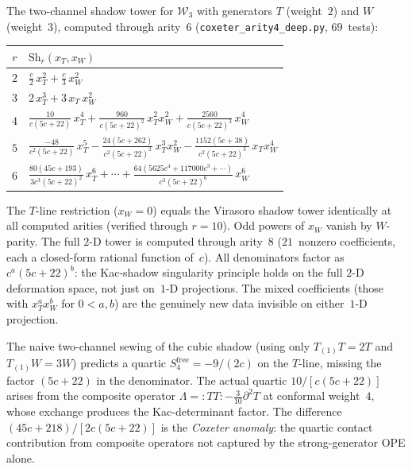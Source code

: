 \begin{example}
\label{ex:w3-shadow-coefficients}
The two-channel shadow tower for $\mathcal{W}_3$ with generators $T$ (weight~$2$) and $W$ (weight~$3$), computed through arity~$6$ (\texttt{coxeter\_arity4\_deep.py}, $69$~tests):
\begin{center}
\small
\renewcommand{\arraystretch}{1.3}
\begin{tabular}{cl}
\toprule
$r$ & $\mathrm{Sh}_r(x_T, x_W)$ \\
\midrule
$2$ & $\frac{c}{2}\,x_T^2 + \frac{c}{3}\,x_W^2$ \\[4pt]
$3$ & $2\,x_T^3 + 3\,x_T\,x_W^2$ \\[4pt]
$4$ & $\frac{10}{c(5c{+}22)}\,x_T^4 + \frac{960}{c(5c{+}22)^2}\,x_T^2 x_W^2 + \frac{2560}{c(5c{+}22)^3}\,x_W^4$ \\[4pt]
$5$ & $\frac{-48}{c^2(5c{+}22)}\,x_T^5
      - \frac{24(5c{+}262)}{c^2(5c{+}22)^2}\,x_T^3 x_W^2
      - \frac{1152(5c{+}38)}{c^2(5c{+}22)^3}\,x_T x_W^4$ \\[4pt]
$6$ & $\frac{80(45c{+}193)}{3c^3(5c{+}22)^2}\,x_T^6
      + \dotsb
      + \frac{64(5625c^4{+}117000c^3{+}\dotsb)}{c^3(5c{+}22)^6}\,x_W^6$ \\
\bottomrule
\end{tabular}
\end{center}
\noindent
The $T$-line restriction ($x_W = 0$) equals the Virasoro shadow tower identically at all computed arities (verified through $r = 10$).  Odd powers of $x_W$ vanish by $W$-parity.  The full $2$-D tower is computed through arity~$8$ ($21$~nonzero coefficients, each a closed-form rational function of~$c$).  All denominators factor as $c^a(5c{+}22)^b$: the Kac-shadow singularity principle holds on the full $2$-D deformation space, not just on~$1$-D projections.  The mixed coefficients (those with $x_T^a x_W^b$ for $0 < a, b$) are the genuinely new data invisible on either~$1$-D projection.
\end{example}

\begin{remark}
\label{rem:coxeter-anomaly}
The naive two-channel sewing of the cubic shadow (using only $T_{(1)}T = 2T$ and $T_{(1)}W = 3W$) predicts a quartic $S_4^{\mathrm{free}} = -9/(2c)$ on the $T$-line, missing the factor $(5c{+}22)$ in the denominator.  The actual quartic $10/[c(5c{+}22)]$ arises from the composite operator $\Lambda = {:}TT{:} - \tfrac{3}{10}\partial^2 T$ at conformal weight~$4$, whose exchange produces the Kac-determinant factor.  The difference $(45c{+}218)/[2c(5c{+}22)]$ is the \emph{Coxeter anomaly}: the quartic contact contribution from composite operators not captured by the strong-generator OPE alone.
\end{remark}

